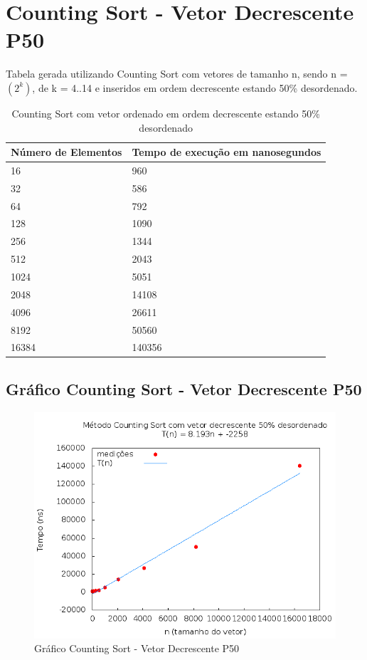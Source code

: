 \documentclass[12pt,a4paper,twoside]{report}
\begin{document}
\section{Counting Sort - Vetor Decrescente P50}
Tabela gerada utilizando Counting Sort com vetores de tamanho n, sendo n = $(2^k)$, de k = 4..14 e inseridos em ordem decrescente estando 50\% desordenado.
\begin{table}[H]
\centering
\caption{Counting Sort com vetor ordenado em ordem decrescente estando 50\% desordenado}
\label{my-label}
\begin{tabular}{|l|l|}
\hline
\multicolumn{1}{|c|}{\textbf{Número de Elementos}} & \multicolumn{1}{c|}{\textbf{Tempo de execução em nanosegundos}} \\ \hline
16 & 960 \\ \hline
32 & 586 \\ \hline
64 & 792 \\ \hline
128 & 1090 \\ \hline
256 & 1344 \\ \hline
512 & 2043 \\ \hline
1024 & 5051 \\ \hline
2048 & 14108 \\ \hline
4096 & 26611 \\ \hline
8192 & 50560 \\ \hline
16384 & 140356 \\ \hline
\end{tabular}
\end{table}

\subsection{Gráfico Counting Sort - Vetor Decrescente P50}
\begin{figure}[H]
    \centering
    \includegraphics[width=0.7\linewidth]{graficos/CountingSort/vIntDecrescenteP50/vIntDecrescenteP50.png}
  \caption{Gráfico Counting Sort - Vetor Decrescente P50}
\end{figure}
\end{document}
